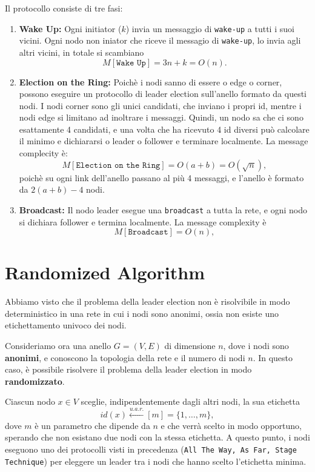 Il protocollo consiste di tre fasi:
\begin{enumerate}
    \item \textbf{Wake Up:} Ogni initiator ($k$) invia un messaggio di \texttt{wake-up} a tutti i suoi vicini. Ogni nodo non iniator che riceve il messagio di \texttt{wake-up}, lo invia agli altri vicini, in totale si scambiano
    \[
        M[\texttt{Wake Up}] = 3n + k = O(n).
    \]
    \item \textbf{Election on the Ring: } Poichè i nodi sanno di essere o edge o corner, possono eseguire un protocollo di leader election sull'anello formato da questi nodi. I nodi corner sono gli unici candidati, che inviano i propri id, mentre i nodi edge si limitano ad inoltrare i messaggi. Quindi, un nodo sa che ci sono esattamente 4 candidati, e una volta che ha ricevuto 4 id diversi può calcolare il minimo e dichiararsi o leader o follower e terminare localmente. La message complecity è:
    \[
        M[\texttt{Election on the Ring}] = O(a + b) = O(\sqrt{n}),
    \]
    poichè su ogni link dell'anello passano al più 4 messaggi, e l'anello è formato da $2(a+b)-4$ nodi.
    \item \textbf{Broadcast: } Il nodo leader esegue una \texttt{broadcast} a tutta la rete, e ogni nodo si dichiara follower e termina localmente. La message complexity è
    \[
        M[\texttt{Broadcast}] = O(n),
    \]
\end{enumerate}

\section{Randomized Algorithm}

Abbiamo visto che il problema della leader election non è risolvibile in modo deterministico in una rete in cui i nodi sono anonimi, ossia non esiste uno etichettamento univoco dei nodi. 

Consideriamo ora una anello $G = (V, E)$ di dimensione $n$, dove i nodi sono \textbf{anonimi}, e conoscono la topologia della rete e il numero di nodi $n$. In questo caso, è possibile risolvere il problema della leader election in modo \textbf{randomizzato}.

Ciascun nodo $x \in V$ sceglie, indipendentemente dagli altri nodi, la sua etichetta 
\[
    id(x) \xleftarrow{u.a.r.} [m] = \{1, \dots, m\},
\]
dove $m$ è un parametro che dipende da $n$ e che verrà scelto in modo opportuno, sperando che non esistano due nodi con la stessa etichetta. A questo punto, i nodi eseguono uno dei protocolli visti in precedenza (\texttt{All The Way, As Far, Stage Technique}) per eleggere un leader tra i nodi che hanno scelto l'etichetta minima.

